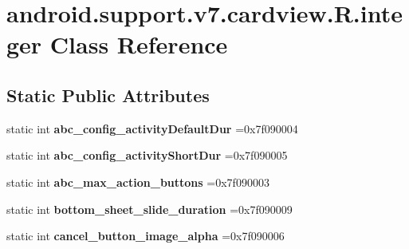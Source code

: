 \hypertarget{classandroid_1_1support_1_1v7_1_1cardview_1_1R_1_1integer}{}\section{android.\+support.\+v7.\+cardview.\+R.\+integer Class Reference}
\label{classandroid_1_1support_1_1v7_1_1cardview_1_1R_1_1integer}
\subsection*{Static Public Attributes}
\begin{DoxyCompactItemize}
\item 
\mbox{\label{classandroid_1_1support_1_1v7_1_1cardview_1_1R_1_1integer_a59a1b0107af007c902f855995a34361b}} 
static int {\bfseries abc\+\_\+config\+\_\+activity\+Default\+Dur} =0x7f090004
\item 
\mbox{\label{classandroid_1_1support_1_1v7_1_1cardview_1_1R_1_1integer_a2902fd80a5c5ae21ab7a1d19236b275a}} 
static int {\bfseries abc\+\_\+config\+\_\+activity\+Short\+Dur} =0x7f090005
\item 
\mbox{\label{classandroid_1_1support_1_1v7_1_1cardview_1_1R_1_1integer_ae34fe3425df8d8ef843ea9c7a16e2e91}} 
static int {\bfseries abc\+\_\+max\+\_\+action\+\_\+buttons} =0x7f090003
\item 
\mbox{\label{classandroid_1_1support_1_1v7_1_1cardview_1_1R_1_1integer_a480d7c2f6b53a5bd6506dfdea27e42c3}} 
static int {\bfseries bottom\+\_\+sheet\+\_\+slide\+\_\+duration} =0x7f090009
\item 
\mbox{\label{classandroid_1_1support_1_1v7_1_1cardview_1_1R_1_1integer_acb324ed140cdb5a90ed559f09c7d793b}} 
static int {\bfseries cancel\+\_\+button\+\_\+image\+\_\+alpha} =0x7f090006
\item 
\mbox{\label{classandroid_1_1support_1_1v7_1_1cardview_1_1R_1_1integer_a2849ab40746fb5d5983ac17637566200}} 

\end{DoxyCompactItemize}
